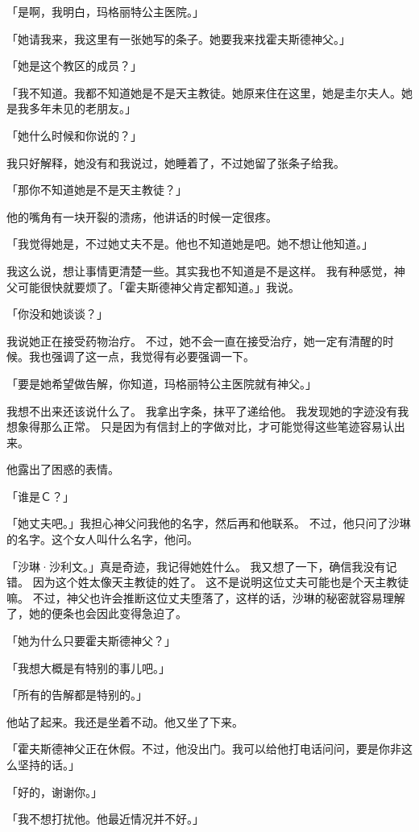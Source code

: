 \documentclass[UTF8]{ctexart}
\begin{document}
「是啊，我明白，玛格丽特公主医院。」

「她请我来，我这里有一张她写的条子。她要我来找霍夫斯德神父。」

「她是这个教区的成员？」

「我不知道。我都不知道她是不是天主教徒。她原来住在这里，她是圭尔夫人。她是我多年未见的老朋友。」

「她什么时候和你说的？」

我只好解释，她没有和我说过，她睡着了，不过她留了张条子给我。

「那你不知道她是不是天主教徒？」

他的嘴角有一块开裂的溃疡，他讲话的时候一定很疼。

「我觉得她是，不过她丈夫不是。他也不知道她是吧。她不想让他知道。」

我这么说，想让事情更清楚一些。其实我也不知道是不是这样。
我有种感觉，神父可能很快就要烦了。「霍夫斯德神父肯定都知道。」我说。

「你没和她谈谈？」

我说她正在接受药物治疗。
不过，她不会一直在接受治疗，她一定有清醒的时候。我也强调了这一点，我觉得有必要强调一下。

「要是她希望做告解，你知道，玛格丽特公主医院就有神父。」

我想不出来还该说什么了。
我拿出字条，抹平了递给他。
我发现她的字迹没有我想象得那么正常。
只是因为有信封上的字做对比，才可能觉得这些笔迹容易认出来。

他露出了困惑的表情。

「谁是Ｃ？」

「她丈夫吧。」我担心神父问我他的名字，然后再和他联系。
不过，他只问了沙琳的名字。这个女人叫什么名字，他问。

「沙琳·沙利文。」真是奇迹，我记得她姓什么。
我又想了一下，确信我没有记错。
因为这个姓太像天主教徒的姓了。
这不是说明这位丈夫可能也是个天主教徒嘛。
不过，神父也许会推断这位丈夫堕落了，这样的话，沙琳的秘密就容易理解了，她的便条也会因此变得急迫了。

「她为什么只要霍夫斯德神父？」

「我想大概是有特别的事儿吧。」

「所有的告解都是特别的。」

他站了起来。我还是坐着不动。他又坐了下来。

「霍夫斯德神父正在休假。不过，他没出门。我可以给他打电话问问，要是你非这么坚持的话。」

「好的，谢谢你。」

「我不想打扰他。他最近情况并不好。」
\end{document}
